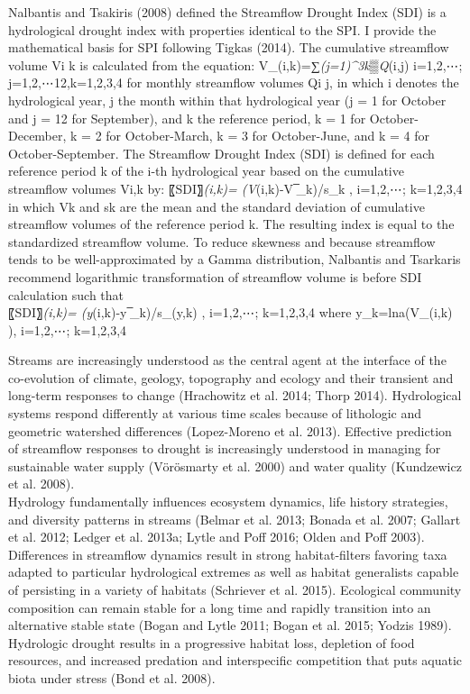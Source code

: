 \documentclass[12pt,twoside]{reedthesis}
\theoremstyle{definition}
\theoremstyle{definition}
\theoremstyle{definition}
\theoremstyle{remark}
\begin{document}
Nalbantis and Tsakiris (2008) defined the Streamflow Drought Index (SDI)
is a hydrological drought index with properties identical to the SPI. I
provide the mathematical basis for SPI following Tigkas (2014). The
cumulative streamflow volume Vi k is calculated from the equation:
V\_(i,k)=∑\emph{(j=1)\^{}3k▒Q}(i,j) i=1,2,⋯; j=1,2,⋯12,k=1,2,3,4 for
monthly streamflow volumes Qi j, in which i denotes the hydrological
year, j the month within that hydrological year (j = 1 for October and j
= 12 for September), and k the reference period, k = 1 for
October-December, k = 2 for October-March, k = 3 for October-June, and k
= 4 for October-September. The Streamflow Drought Index (SDI) is defined
for each reference period k of the i-th hydrological year based on the
cumulative streamflow volumes Vi,k by: 〖SDI〗\emph{(i,k)= (V}(i,k)-V
̅\_k)/s\_k , i=1,2,⋯; k=1,2,3,4 in which Vk and sk are the mean and the
standard deviation of cumulative streamflow volumes of the reference
period k. The resulting index is equal to the standardized streamflow
volume. To reduce skewness and because streamflow tends to be
well-approximated by a Gamma distribution, Nalbantis and Tsarkaris
recommend logarithmic transformation of streamflow volume is before SDI
calculation such that\\
〖SDI〗\emph{(i,k)= (y}(i,k)-y ̅\_k)/s\_(y,k) , i=1,2,⋯; k=1,2,3,4 where
y\_k=lna(V\_(i,k) ), i=1,2,⋯; k=1,2,3,4

Streams are increasingly understood as the central agent at the
interface of the co-evolution of climate, geology, topography and
ecology and their transient and long-term responses to change
(Hrachowitz et al. 2014; Thorp 2014). Hydrological systems respond
differently at various time scales because of lithologic and geometric
watershed differences (Lopez-Moreno et al. 2013). Effective prediction
of streamflow responses to drought is increasingly understood in
managing for sustainable water supply (Vörösmarty et al. 2000) and water
quality (Kundzewicz et al. 2008).\\
Hydrology fundamentally influences ecosystem dynamics, life history
strategies, and diversity patterns in streams (Belmar et al. 2013;
Bonada et al. 2007; Gallart et al. 2012; Ledger et al. 2013a; Lytle and
Poff 2016; Olden and Poff 2003). Differences in streamflow dynamics
result in strong habitat-filters favoring taxa adapted to particular
hydrological extremes as well as habitat generalists capable of
persisting in a variety of habitats (Schriever et al. 2015). Ecological
community composition can remain stable for a long time and rapidly
transition into an alternative stable state (Bogan and Lytle 2011; Bogan
et al. 2015; Yodzis 1989). Hydrologic drought results in a progressive
habitat loss, depletion of food resources, and increased predation and
interspecific competition that puts aquatic biota under stress (Bond et
al. 2008).
\end{document}
